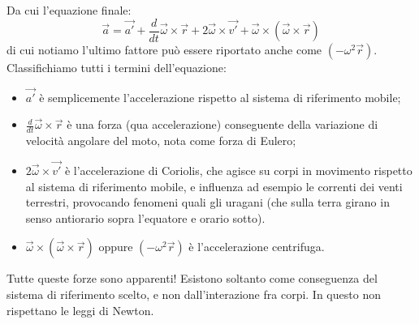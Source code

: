 \documentclass[a4paper,12pt]{article}
\begin{document}
Da cui l'equazione finale:
$$ \vec{a} = \vec{a'} + \frac{d}{dt}\vec{\omega} \times \vec{r} + 2\vec{\omega} \times \vec{v'} + \vec{\omega} \times (\vec{\omega} \times \vec{r}) $$
di cui notiamo l'ultimo fattore può essere riportato anche come $(-\omega^2\vec{r})$.
Classifichiamo tutti i termini dell'equazione:
\begin{itemize}
  \item $\vec{a'}$ è semplicemente l'accelerazione rispetto al sistema di riferimento mobile;
  \item $\frac{d}{dt}\vec{\omega} \times \vec{r}$ è una forza (qua accelerazione) conseguente della variazione di velocità angolare del moto,
    nota come forza di Eulero; 
  \item $2\vec{\omega} \times \vec{v'}$ è l'accelerazione di Coriolis, che agisce su corpi in movimento rispetto al sistema di riferimento
    mobile, e influenza ad esempio le correnti dei venti terrestri, provocando fenomeni quali gli uragani (che sulla terra girano in senso
    antiorario sopra l'equatore e orario sotto).
  \item $\vec{\omega} \times (\vec{\omega} \times \vec{r})$ oppure $(-\omega^2 \vec{r})$ è l'accelerazione centrifuga.
\end{itemize}
Tutte queste forze sono apparenti! Esistono soltanto come conseguenza del sistema di riferimento scelto, e non dall'interazione fra corpi. In
questo non rispettano le leggi di Newton.
\end{document}
